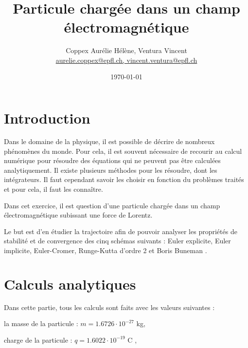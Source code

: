 \documentclass[a4paper,12pt,twoside]{article}
\newcommand{\mail}[1]{{\href{mailto:#1}{#1}}}
\begin{document}
	\title{Particule charg\'ee dans un champ \'electromagn\'etique}
	\author{Coppex Aur\'elie H\'el\`ene, Ventura Vincent\\  %
	{\small \mail{aurelie.coppex@epfl.ch, vincent.ventura@epfl.ch}}}
	\date{\today}\maketitle
	\tableofcontents %
\newpage



\section{Introduction} %

	Dans le domaine de la physique, il est possible de d\'ecrire de nombreux phénomènes du monde. Pour cela, il est souvent n\'ecessaire de recourir au calcul num\'erique pour r\'esoudre des \'equations qui ne peuvent pas \^etre calcul\'ees analytiquement. Il existe plusieurs m\'ethodes pour les r\'esoudre, dont les int\'egrateurs. Il faut cependant savoir les choisir en fonction du probl\`emes trait\'es et pour cela, il faut les conna\^itre.

	Dans cet exercice, il est question d'une particule charg\'ee dans un champ \'electromagn\'etique subissant une force de Lorentz. 
	
	Le but est d'en \'etudier la trajectoire afin de pouvoir analyser les propri\'et\'es de stabilit\'e et de convergence des cinq sch\'emas suivants : 
	Euler explicite, Euler implicite, Euler-Cromer, Runge-Kutta d'ordre 2 et Boris Buneman \cite{NdC}.


\section{Calculs analytiques}

	\noindent Dans cette partie, tous les calculs sont faits avec les valeurs suivantes \cite{Notes} :
	
	\noindent la masse de la particule : $m = 1.6726 \cdot 10^{-27}$ kg, 
	
	\noindent charge de la particule :	$q = 1.6022 \cdot 10^{-19}$ C ,
	
\end{document}
